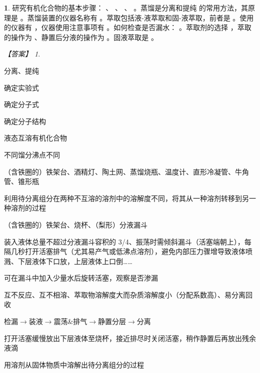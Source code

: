 \documentclass[UTF8, 10pt, a4paper, oneside]{ctexart}
\newcommand{\blank}{ \underbar{\quad$\blacktriangle$\quad} }%
\newcommand{\chdots}{…\hspace{-0.15em}…}%
\theoremstyle{definition}
\newtheorem{subexercise}{}[exercise]%
\theoremstyle{remark}
\newtheorem*{answer}{【答案】}
\theoremstyle{plain}
\begin{document}
\setcounter{exercise}{5}
\begin{subexercise}
    研究有机化合物的基本步骤：\blank 、\blank 、\blank 、\blank 。蒸馏是分离和提纯\blank 的常用方法，其原理是\blank 。蒸馏装置的仪器名称有\blank 。萃取包括液-液萃取和固-液萃取，前者是\blank 。使用的仪器有\blank ，仪器使用注意事项有\blank 。如何检查是否漏水：\blank 。萃取剂的选择\blank ，萃取的操作为\blank 、静置后分液的操作为\blank 。固液萃取是\blank 。
    \begin{answer}
        \begin{inparaenum}
            \item[\setcounter{enumi}{1}\textsuperscript{\arabic{enumi}}] 分离、提纯
            \item 确定实验式
            \item 确定分子式
            \item 确定分子结构
            \item 液态互溶有机化合物
            \item 不同馏分沸点不同
            \item （含铁圈的）铁架台、酒精灯、陶土网、蒸馏烧瓶、温度计、直形冷凝管、牛角管、锥形瓶
            \item 利用待分离组分在两种不互溶的溶剂中的溶解度不同，将其从一种溶剂转移到另一种溶剂的过程
            \item （含铁圈的）铁架台、烧杯、（梨形）分液漏斗
            \item 装入液体总量不超过分液漏斗容积的 3/4、振荡时需倾斜漏斗（活塞端朝上），每隔几秒打开活塞排气（尤其易产气或低沸点溶剂），避免内部压力骤增导致液体喷溅、下层液体下口放，上层液体上口倒\chdots
            \item 可在漏斗中加入少量水后旋转活塞，观察是否渗漏
            \item 互不反应、互不相溶、萃取物溶解度大而杂质溶解度小（分配系数高）、易分离回收
            \item 检漏$\rightarrow$装液$\rightarrow$震荡\&排气$\rightarrow$静置分层$\rightarrow$分离
            \item 打开活塞缓慢放出下层液体至烧杯，接近排尽时关闭活塞，稍作静置后再放出残余液滴
            \item 用溶剂从固体物质中溶解出待分离组分的过程
        \end{inparaenum}
    \end{answer}
\end{subexercise}
\end{document}
